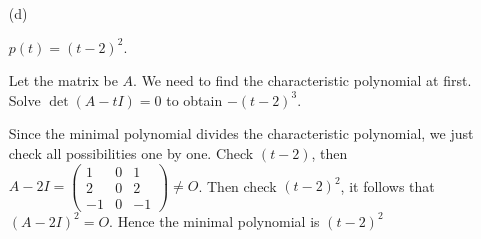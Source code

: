 \begin{Exercise}
\begin{enumerate}[(a)]
\item[(d)]
\begin{answer}
$p(t) = (t-2)^2$.
\end{answer}
\begin{solution}
Let the matrix be $A$.
We need to find the characteristic polynomial at first.
Solve $\det(A-t I)= 0$ to obtain $-(t-2)^3$.

Since the minimal polynomial divides the characteristic polynomial, we just check all possibilities one by one.
Check $(t-2)$, then $A-2I = \begin{pmatrix}
1 & 0 & 1 \\
2 & 0 & 2 \\
-1 & 0 & -1
\end{pmatrix} \neq O$. Then check $(t-2)^2$, it follows that $(A-2I)^2 = O$. Hence the minimal polynomial is $(t-2)^2$
\end{solution}
\end{enumerate}
\end{Exercise} 